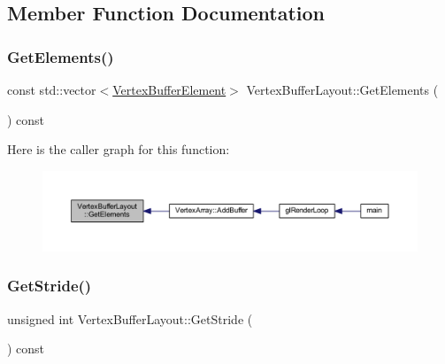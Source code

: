 \subsection{Member Function Documentation}
\mbox{\label{class_vertex_buffer_layout_a9d81400c5f992ed1f287aa75267eb2f4}} 
\subsubsection{\texorpdfstring{Get\+Elements()}{GetElements()}}
{\footnotesize\ttfamily const std\+::vector$<$\mbox{\hyperlink{struct_vertex_buffer_element}{Vertex\+Buffer\+Element}}$>$ Vertex\+Buffer\+Layout\+::\+Get\+Elements (\begin{DoxyParamCaption}{ }\end{DoxyParamCaption}) const\hspace{0.3cm}{\ttfamily [inline]}}

Here is the caller graph for this function\+:
\nopagebreak
\begin{figure}[H]
\begin{center}
\leavevmode
\includegraphics[width=350pt]{class_vertex_buffer_layout_a9d81400c5f992ed1f287aa75267eb2f4_icgraph}
\end{center}
\end{figure}
\mbox{\label{class_vertex_buffer_layout_aca33593016f0360720489d25b933ac4a}} 
\subsubsection{\texorpdfstring{Get\+Stride()}{GetStride()}}
{\footnotesize\ttfamily unsigned int Vertex\+Buffer\+Layout\+::\+Get\+Stride (\begin{DoxyParamCaption}{ }\end{DoxyParamCaption}) const\hspace{0.3cm}{\ttfamily [inline]}}

